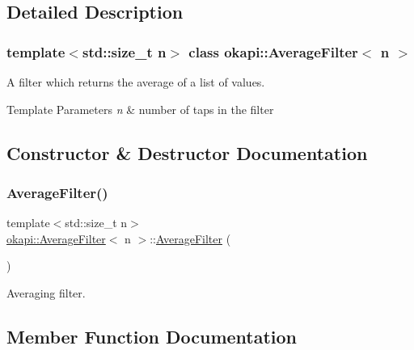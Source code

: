 \subsection{Detailed Description}
\subsubsection*{template$<$std\+::size\+\_\+t n$>$\newline
class okapi\+::\+Average\+Filter$<$ n $>$}

A filter which returns the average of a list of values.


\begin{DoxyTemplParams}{Template Parameters}
{\em n} & number of taps in the filter \\
\hline
\end{DoxyTemplParams}


\subsection{Constructor \& Destructor Documentation}
\mbox{\label{classokapi_1_1AverageFilter_a21483cccbe9d9aa49200c3b4b6d8a878}} 
\subsubsection{\texorpdfstring{AverageFilter()}{AverageFilter()}}
{\footnotesize\ttfamily template$<$std\+::size\+\_\+t n$>$ \\
\mbox{\hyperlink{classokapi_1_1AverageFilter}{okapi\+::\+Average\+Filter}}$<$ n $>$\+::\mbox{\hyperlink{classokapi_1_1AverageFilter}{Average\+Filter}} (\begin{DoxyParamCaption}{ }\end{DoxyParamCaption})\hspace{0.3cm}{\ttfamily [default]}}

Averaging filter. 

\subsection{Member Function Documentation}
\mbox{\label{classokapi_1_1AverageFilter_a6030d718df73a9a1d7a99c104c3e564e}} 
